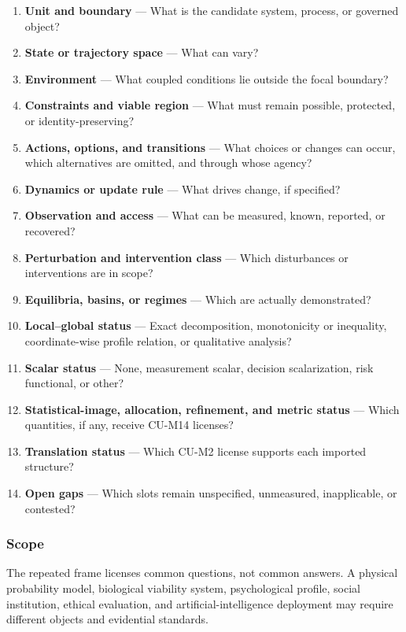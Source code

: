 \documentclass[
  11pt,
]{article}
\providecommand{\tightlist}{%
  \setlength{\itemsep}{0pt}\setlength{\parskip}{0pt}}
\begin{document}
\begin{enumerate}
\def\labelenumi{\arabic{enumi}.}
\tightlist
\item
  \textbf{Unit and boundary} --- What is the candidate system, process,
  or governed object?
\item
  \textbf{State or trajectory space} --- What can vary?
\item
  \textbf{Environment} --- What coupled conditions lie outside the focal
  boundary?
\item
  \textbf{Constraints and viable region} --- What must remain possible,
  protected, or identity-preserving?
\item
  \textbf{Actions, options, and transitions} --- What choices or changes
  can occur, which alternatives are omitted, and through whose agency?
\item
  \textbf{Dynamics or update rule} --- What drives change, if specified?
\item
  \textbf{Observation and access} --- What can be measured, known,
  reported, or recovered?
\item
  \textbf{Perturbation and intervention class} --- Which disturbances or
  interventions are in scope?
\item
  \textbf{Equilibria, basins, or regimes} --- Which are actually
  demonstrated?
\item
  \textbf{Local--global status} --- Exact decomposition, monotonicity or
  inequality, coordinate-wise profile relation, or qualitative analysis?
\item
  \textbf{Scalar status} --- None, measurement scalar, decision
  scalarization, risk functional, or other?
\item
  \textbf{Statistical-image, allocation, refinement, and metric status}
  --- Which quantities, if any, receive CU-M14 licenses?
\item
  \textbf{Translation status} --- Which CU-M2 license supports each
  imported structure?
\item
  \textbf{Open gaps} --- Which slots remain unspecified, unmeasured,
  inapplicable, or contested?
\end{enumerate}

\subsubsection{Scope}\label{scope-10}

The repeated frame licenses common questions, not common answers. A
physical probability model, biological viability system, psychological
profile, social institution, ethical evaluation, and
artificial-intelligence deployment may require different objects and
evidential standards.
\end{document}
